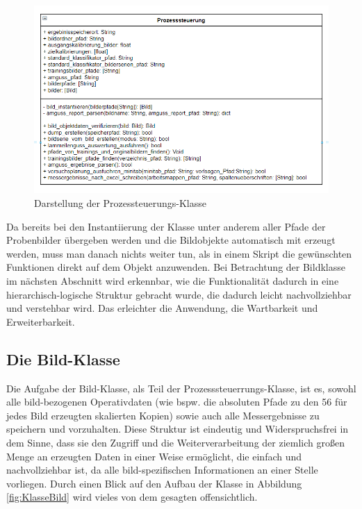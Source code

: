 \documentclass[
fontsize=10pt, 
listof = totoc,
parskip = half	
]{report}
\begin{document}
\begin{figure}[H]
	\centering
	\includegraphics[scale=0.6]{pics/class_runner}
	\caption{Darstellung der Prozessteuerungs-Klasse}
	\label{fig:KlasseProzessteuerung}
\end{figure}

\noindent Da bereits bei den Instantiierung der Klasse unter anderem aller Pfade der Probenbilder übergeben werden und die Bildobjekte automatisch mit erzeugt werden, muss man danach nichts weiter tun, als in einem Skript die gewünschten Funktionen direkt auf dem Objekt anzuwenden. Bei Betrachtung der Bildklasse im nächsten Abschnitt wird erkennbar, wie die Funktionalität dadurch in eine hierarchisch-logische Struktur gebracht wurde, die dadurch leicht nachvollziehbar und verstehbar wird. Das erleichter die Anwendung, die Wartbarkeit und Erweiterbarkeit.

\subsection{Die Bild-Klasse}

Die Aufgabe der Bild-Klasse, als Teil der Prozesssteuerrungs-Klasse, ist es, sowohl alle bild-bezogenen Operativdaten (wie bspw. die absoluten Pfade zu den 56 für jedes Bild erzeugten skalierten Kopien) sowie auch alle Messergebnisse zu speichern und vorzuhalten. Diese Struktur ist eindeutig und Widerspruchsfrei in dem Sinne, dass sie den Zugriff und die Weiterverarbeitung der ziemlich großen Menge an erzeugten Daten in einer Weise ermöglicht, die einfach und nachvollziehbar ist, da alle bild-spezifischen Informationen an einer Stelle vorliegen. Durch einen Blick auf den Aufbau der Klasse in Abbildung \ref{fig:KlasseBild} wird vieles von dem gesagten offensichtlich.
\end{document}
